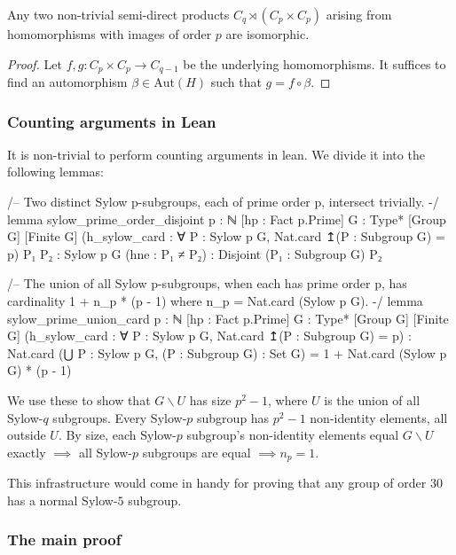 \begin{lemma}
    Any two non-trivial semi-direct products $C_q \rtimes (C_p \times C_p)$ arising from homomorphisms with images of order $p$ are isomorphic.
\end{lemma}
\begin{proof}
    Let $f, g : C_p \times C_p \rightarrow C_{q-1}$ be the underlying homomorphisms. It suffices to find an automorphism $\beta \in \text{Aut}(H)$ such that $g = f \circ \beta$. 
\end{proof}

\subsubsection{Counting arguments in Lean}

It is non-trivial to perform counting arguments in lean. We divide it into the following lemmas:

\begin{leancode}
/-- Two distinct Sylow p-subgroups, each of prime order p, intersect trivially. -/
lemma sylow_prime_order_disjoint {p : ℕ} [hp : Fact p.Prime]
    {G : Type*} [Group G] [Finite G]
    (h_sylow_card : ∀ P : Sylow p G, Nat.card ↥(P : Subgroup G) = p)
    {P₁ P₂ : Sylow p G} (hne : P₁ ≠ P₂) :
    Disjoint (P₁ : Subgroup G) P₂
\end{leancode}

\begin{leancode}
/-- The union of all Sylow p-subgroups, when each has prime order p, has
    cardinality 1 + n_p * (p - 1) where n_p = Nat.card (Sylow p G). -/
lemma sylow_prime_union_card {p : ℕ} [hp : Fact p.Prime]
    {G : Type*} [Group G] [Finite G]
    (h_sylow_card : ∀ P : Sylow p G, Nat.card ↥(P : Subgroup G) = p) :
    Nat.card (⋃ P : Sylow p G, (P : Subgroup G) : Set G) =
      1 + Nat.card (Sylow p G) * (p - 1)
\end{leancode}

We use these to show that $G \backslash U$ has size $p^2 - 1$, where $U$ is the union of all Sylow-$q$ subgroups. Every Sylow-$p$ subgroup has $p^2 - 1$ non-identity elements, all outside $U$. By size, each Sylow-$p$ subgroup's non-identity elements equal $G \backslash U$ exactly $\implies$ all Sylow-$p$ subgroups are equal $\implies n_p = 1$.

This infrastructure would come in handy for proving that any group of order $30$ has a normal Sylow-$5$ subgroup.

\subsubsection{The main proof}

